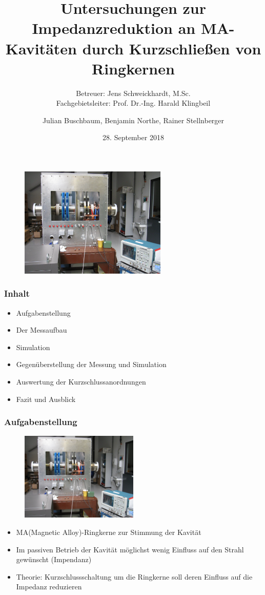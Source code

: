 \documentclass[accentcolor=tud9b, colorbacktitle, inverttitle]{tudbeamer}
\author{Julian Buschbaum, Benjamin Northe, Rainer Stellnberger}
\institute{Institut TEMF~\textbar~Fachgebiet Beschleunigertechnik}
\date{28. September 2018}
\title{Untersuchungen zur Impedanzreduktion an MA-Kavitäten durch Kurzschließen von Ringkernen \vspace{0.2em}}
\subtitle{Betreuer: Jens Schweickhardt, M.Sc.\\ Fachgebietsleiter: Prof. Dr.-Ing. Harald Klingbeil}
\begin{document}
\begin{titleframe}
\vspace{-1em}
	\begin{figure}[h]
		\centering
		\includegraphics[width=0.625\textwidth]{Kavitaet}
	\end{figure}
\end{titleframe}





\begin{frame}\frametitle{Inhalt}
	\begin{itemize}
		\item Aufgabenstellung
		\item Der Messaufbau
		\item Simulation
		\item Gegen\"uberstellung der Messung und Simulation
		\item Auswertung der Kurzschlussanordnungen
		\item Fazit und Ausblick
	\end{itemize}
\end{frame}


\begin{frame}\frametitle{Aufgabenstellung}
\begin{multicols}{2}
\vspace{-2em}
	\begin{figure}[h]
		\centering
		\includegraphics[width=0.5\textwidth]{Kavitaet}
	\end{figure}
	\vfill\null
	\columnbreak
	\begin{itemize}
		\item MA(Magnetic Alloy)-Ringkerne zur Stimmung der Kavit\"at
		\item Im passiven Betrieb der Kavit\"at m\"oglichst wenig Einfluss auf den Strahl gewünscht (Impendanz)
		\item Theorie: Kurzschlussschaltung um die Ringkerne soll deren Einfluss auf die Impedanz reduzieren
	\end{itemize}
\end{multicols}
\end{frame}
\end{document}
